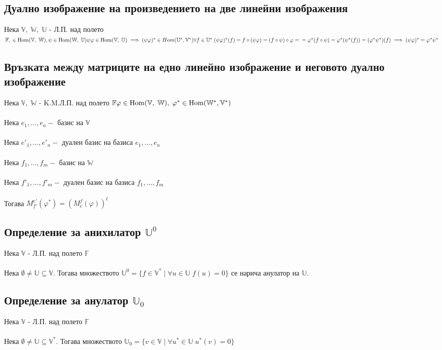 \documentclass{article}
\newcommand{\V}{\mathbb{V}}
\newcommand{\F}{\mathbb{F}}
\newcommand{\W}{\mathbb{W}}
\newcommand{\UV}{\mathbb{U}}
\newcommand{\n}[1]{#1_1, \dots, #1_n}
\newcommand{\m}[1]{#1_1, \dots, #1_m}
\begin{document}
    \subsection{Дуално изображение на произведението на две линейни изображения}
    Нека \(\V, \; \W, \; \UV\) - Л.П. над полето \(\F, \; \in \mathrm{Hom}(\V, \; \W), \psi \in \mathrm{Hom}(\W, \; \UV) \\\\
    \psi\varphi \in \mathrm{Hom}(\V, \; \UV) \implies (\psi\varphi)^* \in Hom(\UV^*, \V^*) \\\\
    \forall f \in \UV^* \; (\psi\varphi)^*(f) = f \circ (\psi\varphi) = (f \circ \psi) \circ \varphi = \\\\
    = \varphi^*(f \circ \psi) = \varphi^*(\psi^*(f)) = (\varphi^*\psi^*)(f) \\\\
    \implies (\psi\varphi)^* = \varphi^*\psi^*\)
    \subsection{Връзката между матриците на едно линейно изображение и неговото дуално изображение}
    Нека \(\V, \; \W\) - K.M.Л.П. над полето \(\F \\\\
    \varphi \in \mathrm{Hom}(\V, \; \W), \; \varphi^* \in \mathrm{Hom}(\W^*, \V^*)\) \\\\
    Нека \(\n{e} - \text{ базис на } \V\) \\\\
    Нека \(\n{e'} - \text{ дуален базис на базиса } \n{e}\) \\\\
    Нека \(\m{f} - \text{ базис на } \W\) \\\\
    Нека \(\m{f'} - \text{ дуален базис на базиса } \m{f}\) \\\\
    Тогава \(M_{f'}^{e'}(\varphi^*) = (M_e^f(\varphi))^t\)
    \subsection{Определение за анихилатор \(\UV^0\)}
    Нека \(\V\) - Л.П. над полето \(\F\) \\\\
    Нека \(\emptyset \neq \UV \subseteq \V\). Тогава множеството
    \(\UV^0 = \{f \in \V^* \; | \; \forall u \in \UV \; f(u) = 0\}\)
    се нарича анулатор на \(\UV\).
    \subsection{Определение за анулатор \(\UV_0\)}
    Нека \(\V\) - Л.П. над полето \(\F\) \\\\
    Нека \(\emptyset \neq \UV \subseteq \V^*\). Тогава множеството
    \(\UV_0 = \{v \in \V \; | \; \forall u^* \in \UV \; u^*(v) = 0\}\)
\end{document}
